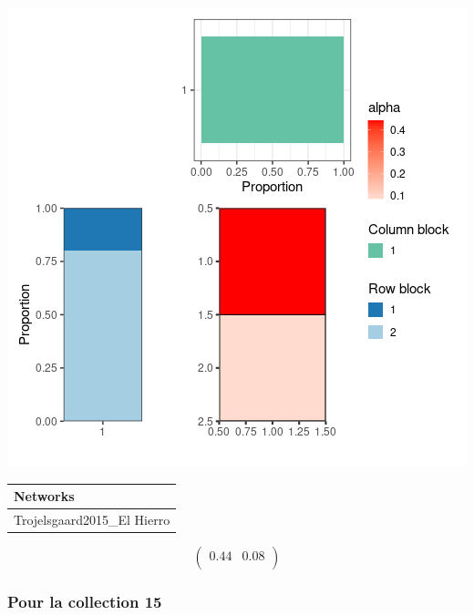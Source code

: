 \includegraphics{./img/888bd40e8c6409a43aae4aa9744e362b2ea7da34.png}\newline \tiny

\begin{tabular}{l}
\toprule
Networks\\
\midrule
Trojelsgaard2015\_El Hierro\\
\bottomrule
\end{tabular}

\normalsize\newline\[\begin{pmatrix} 0.44 &0.08 \\ \end{pmatrix}\]

\subsubsection{Pour la collection 15 }

